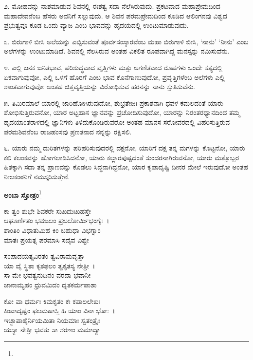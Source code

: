 ೨. ಮೋಹವನ್ನು ನಾಶಮಾಡುವ ಶಿವನಲ್ಲಿ ಈಶತ್ವ ಸದಾ ನೆಲೆಸಿರುವುದು. ಪ್ರಕಟವಾದ ಮಹಾಪ್ರೇಮದಿಂದ ಮಹಾದೇವನೆಂಬ ಹೆಸರು ಅವನಿಗೆ ಸಲ್ಲುವುದು. ಆ ಶಿವನ ಪರಮಪ್ರೇಮದಿಂದ ಕೂಡಿದ ಆಲಿಂಗನವು ವಿಶ್ವದ ಪ್ರಭುತ್ವವೂ ಕೂಡ ಒಂದು ವ್ಯಾಜ ಎಂಬ ಭಾವವನ್ನು ಹೃದಯದಲ್ಲಿ ಉಂಟುಮಾಡುವುದು.

೩. ಬಿರುಗಾಳಿ ಬೀಸಿ ಅಲೆಯನ್ನು ಎಬ್ಬಿಸುವಂತೆ ಪೂರ್ವಸಂಸ್ಕಾರವೆಂಬ ಮಹಾ ಬಿರುಗಾಳಿ ಬೀಸಿ, ‘ನಾನು’ ‘ನೀನು’ ಎಂಬ ಅಲೆಗಳನ್ನು ಉಂಟುಮಾಡಿದೆ. ಶಿವನಲ್ಲಿ ನೆಲಸಿರುವ ಅಂತಹ ವಿಕಲಿತ ರೂಪವಾಗಿದ್ದ ಮನಸ್ಸನ್ನು ನಮಿಸುವೆನು.

೪. ಎಲ್ಲಿ ಜನಕ ಜನಿತಭಾವ, ಪರಿಶುದ್ಧವಾದ ವೃತ್ತಿಗಳು ಮತ್ತು ಅಗಣಿತವಾದ ರೂಪಗಳು ಒಂದೇ ಸತ್ಯದಲ್ಲಿ ಏಕವಾಗುವುವೋ, ಎಲ್ಲಿ ಒಳಗೆ ಹೊರಗೆ ಎಂಬ ಭಾವ ಕೊನೆಗಾಣುವುದೋ, ಪ್ರವೃತ್ತಿಗಳೆಂಬ ಅಲೆಗಳು ಎಲ್ಲಿ ಶಾಂತವಾಗುವುವೋ ಅಂತಹ ಚಿತ್ತವೃತ್ತಿಯನ್ನು ವಿರೋಧಿಸುವ ಹರನನ್ನು ನಾನು ಸ್ತುತಿಸುವೆನು.

೫. ತಿಮಿರಮಾಲೆ ಯಾರಲ್ಲಿ ಜಾರಿಹೋಗಿರುವುದೋ, ಶುಭ್ರತೇಜಃ ಪ್ರಕಾಶನಾಗಿ ಧವಳ ಕಮಲದಂತೆ ಯಾರು ಶೋಭಿಸುತ್ತಿರುವನೋ, ಯಾರ ಅಟ್ಟಹಾಸ ಜ್ಞಾನವನ್ನು ಪ್ರಚೋದಿಸುವುದೋ, ಯಾರನ್ನು ನಿರಂತರಧ್ಯಾನದಿಂದ ತಮ್ಮ ಹೃದಯಾಂತರಾಳದಲ್ಲಿ ಜ್ಞಾನಿಗಳು ತಿಳಿದುಕೊಂಡಿರುವರೋ ಅಂತಹ ಮಾನಸ ಸರೋವರದಲ್ಲಿ ವಿಹರಿಸುತ್ತಿರುವ ಪರಮಶಿವನೆಂಬ ರಾಜಹಂಸವು ಪ್ರಣತನಾದ ನನ್ನನ್ನು ರಕ್ಷಿಸಲಿ.

೬. ಯಾರು ನಮ್ಮ ದುರಿತಗಳನ್ನು ಪರಿಹರಿಸುವುದರಲ್ಲಿ ದಕ್ಷನೋ, ಯಾರಿಗೆ ದಕ್ಷ ತನ್ನ ಮಗಳನ್ನು ಕೊಟ್ಟನೋ, ಯಾರು ಕಲಿ ಕಲಂಕವನ್ನು ಹೋಗಲಾಡಿಸಿದನೋ, ಯಾರು ಕಲ್ಲಾರಪುಷ್ಪದಂತೆ ಸುಂದರನಾಗಿರುವನೋ, ಯಾರು ಮತ್ತೊಬ್ಬರ ಹಿತಕ್ಕಾಗಿ ಸದಾ ತನ್ನ ಪ್ರಾಣವನ್ನು ಕೊಡಲು ಸಿದ್ಧನಾಗಿದ್ದನೋ, ಯಾರ ಕೃಪಾದೃಷ್ಟಿ ದೀನರ ಮೇಲೆ ಇರುವುದೋ ಅಂತಹ ನೀಲಕಂಠನಿಗೆ ನಮಸ್ಕರಿಸುತ್ತೇನೆ.

\begin{center}
\textbf{ಅಂಬಾ ಸ್ತೋತ್ರಂ}\footnote{}
\end{center}

\begin{myquote}
ಕಾ ತ್ವಂ ಶುಭೇ ಶಿವಕರೇ ಸುಖದುಃಖಹಸ್ತೇ\\ಆಘೂರ್ಣಿತಂ ಭವಜಲಂ ಪ್ರಬಲೋರ್ಮಿಭಂಗೈಃ~।\\ಶಾಂತಿಂ ವಿಧಾತುಮಿಹ ಕಿಂ ಬಹುಧಾ ವಿಭಗ್ನಾಂ\\
ಮಾತಃ ಪ್ರಯತ್ನ ಪರಮಾಸಿ ಸದೈವ ವಿಶ್ವೇ
\end{myquote}


\begin{myquote}
ಸಂಪಾದಯತ್ಯವಿರತಂ ತ್ವವಿರಾಮವೃತ್ತಾ\\ಯಾ ವೈ ಸ್ಥಿತಾ ಕೃತಫಲಂ ತ್ವಕೃತಸ್ಯ ನೇತ್ರೀ~।\\
ಸಾ ಮೇ ಭವತ್ವನುದಿನಂ ವರದಾ ಭವಾನೀ\\ಜಾನಾಮ್ಯಹಂ ಧ್ರುವಮಿದಂ ಧೃತಕರ್ಮಪಾಶಾ
\end{myquote}


\begin{myquote}
ಕೋ ವಾ ಧರ್ಮಃ ಕಿಮಕೃತಂ ಕಃ ಕಪಾಲಲೇಖಃ\\ಕಿಂವಾದೃಷ್ಟಂ ಫಲಮಹಾಸ್ತಿ ಹಿ ಯಾಂ ವಿನಾ ಭೋಃ~।\\
ಇಚ್ಛಾಪಾಶೈರ್ನಿಯಮಿತಾ ನಿಯಮಾಃ ಸ್ವತಂತ್ರೈಃ\\ಯಸ್ಯಾ ನೇತ್ರೀ ಭವತು ಸಾ ಶರಣಂ ಮಮಾದ್ಯಾ
\end{myquote}

